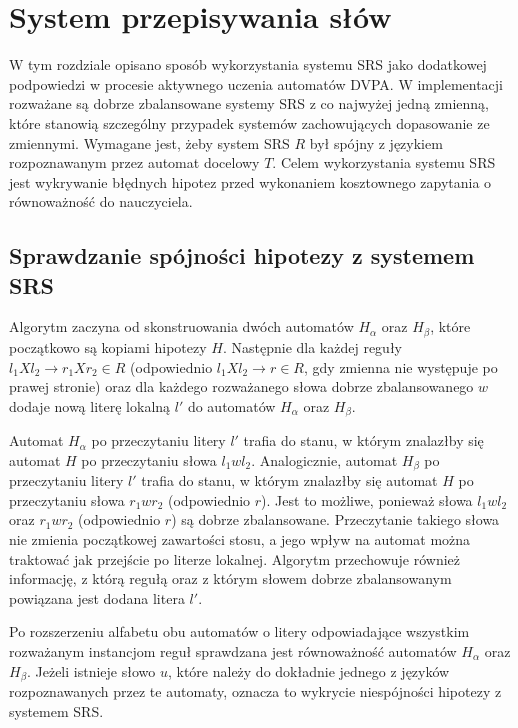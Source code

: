 \chapter{System przepisywania słów}
\label{chap:srs}

W tym rozdziale opisano sposób wykorzystania systemu SRS jako dodatkowej podpowiedzi w procesie aktywnego uczenia automatów DVPA.
W implementacji rozważane są dobrze zbalansowane systemy SRS z co najwyżej jedną zmienną, które stanowią szczególny
przypadek systemów zachowujących dopasowanie ze zmiennymi. Wymagane jest, żeby system SRS $R$ był spójny z językiem
rozpoznawanym przez automat docelowy $T$. Celem wykorzystania systemu SRS jest wykrywanie błędnych hipotez przed wykonaniem
kosztownego zapytania o równoważność do nauczyciela.

\section{Sprawdzanie spójności hipotezy z systemem SRS}

Algorytm zaczyna od skonstruowania dwóch automatów $H_{\alpha}$ oraz $H_{\beta}$, które początkowo są kopiami hipotezy $H$.
Następnie dla każdej reguły $l_1Xl_2 \to r_1Xr_2 \in R$ (odpowiednio $l_1Xl_2 \to r \in R$, gdy zmienna nie występuje po prawej stronie)
oraz dla każdego rozważanego słowa dobrze zbalansowanego $w$ dodaje nową literę lokalną $l'$ do automatów $H_{\alpha}$ oraz $H_{\beta}$.

Automat $H_{\alpha}$ po przeczytaniu litery $l'$ trafia do stanu, w którym znalazłby się automat $H$ po
przeczytaniu słowa $l_1wl_2$. Analogicznie, automat $H_{\beta}$ po przeczytaniu litery $l'$ trafia do stanu,
w którym znalazłby się automat $H$ po przeczytaniu słowa $r_1wr_2$ (odpowiednio $r$).
Jest to możliwe, ponieważ słowa $l_1wl_2$ oraz $r_1wr_2$ (odpowiednio $r$) są dobrze zbalansowane.
Przeczytanie takiego słowa nie zmienia początkowej zawartości stosu, a jego wpływ na automat można traktować
jak przejście po literze lokalnej. Algorytm przechowuje również informację, z którą regułą oraz z którym słowem
dobrze zbalansowanym powiązana jest dodana litera $l'$.

Po rozszerzeniu alfabetu obu automatów o litery odpowiadające wszystkim rozważanym instancjom reguł sprawdzana
jest równoważność automatów $H_{\alpha}$ oraz $H_{\beta}$. Jeżeli istnieje słowo $u$, które należy do dokładnie jednego
z języków rozpoznawanych przez te automaty, oznacza to wykrycie niespójności hipotezy z systemem SRS.

